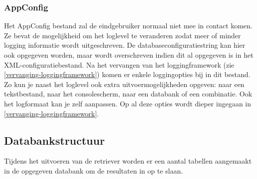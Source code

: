 \subsubsection{AppConfig}
Het AppConfig bestand zal de eindgebruiker normaal niet mee in contact komen.
Ze bevat de mogelijkheid om het loglevel te veranderen zodat meer of minder logging informatie wordt uitgeschreven.
De databaseconfiguratiestring kan hier ook opgegeven worden, maar wordt overschreven indien dit al opgegeven is in het XML-configuratiebestand.
Na het vervangen van het loggingframework (zie \cref{vervanging-loggingframework}) komen er enkele loggingopties bij in dit bestand.
Zo kun je naast het loglevel ook extra uitvoermogelijkheden opgeven: naar een tekstbestand, naar het consolescherm, naar een databank of een combinatie.
Ook het logformaat kan je zelf aanpassen. Op al deze opties wordt dieper ingegaan in \cref{vervanging-loggingframework}.


\subsection{Databankstructuur}
Tijdens het uitvoeren van de retriever worden er een aantal tabellen aangemaakt in de opgegeven databank om de resultaten in op te slaan.


